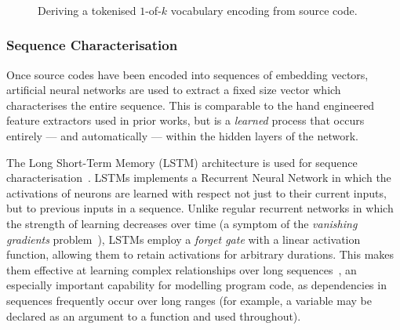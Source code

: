 \begin{figure}
  \centering %
  \\%
  \\%
  \\%
  \caption[Deriving a vocabulary encoding from source code]{%
    Deriving a tokenised $1$-of-$k$ vocabulary encoding from source
    code.%
  }%
  \label{fig:encoding}%
\end{figure}


\subsubsection{Sequence Characterisation}

Once source codes have been encoded into sequences of embedding vectors, artificial neural networks are used to extract a fixed size vector which characterises the entire sequence. This is comparable to the hand engineered feature extractors used in prior works, but is a \emph{learned} process that occurs entirely --- and automatically --- within the hidden layers of the network.

The Long Short-Term Memory (LSTM) architecture is used for sequence characterisation~\cite{Hochreiter1997}. LSTMs implements a Recurrent Neural Network in which the activations of neurons are learned with respect not just to their current inputs, but to previous inputs in a sequence. Unlike regular recurrent networks in which the strength of learning decreases over time (a symptom of the \emph{vanishing gradients} problem~\cite{Pacanu2013}), LSTMs employ a \emph{forget gate} with a linear activation function, allowing them to retain activations for arbitrary durations. This makes them effective at learning complex relationships over long sequences~\cite{Lipton2015}, an especially important capability for modelling program code, as dependencies in sequences frequently occur over long ranges (for example, a variable may be declared as an argument to a function and used throughout).

